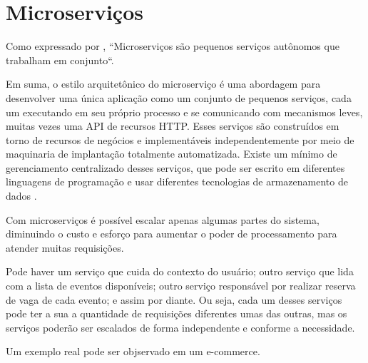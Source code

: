 \chapter{Microserviços}\label{microservicos}

Como expressado por
\cite{building-microservices}, ``Microserviços são pequenos serviços
autônomos que trabalham em conjunto``.

\begin{citacao}
Em suma, o estilo arquitetônico do microserviço é uma abordagem para desenvolver
uma única aplicação como um conjunto de pequenos serviços, cada um executando em seu próprio processo e se comunicando
com mecanismos leves, muitas vezes uma API de recursos HTTP. Esses serviços são construídos em torno de recursos de
negócios e implementáveis independentemente por meio de maquinaria de implantação totalmente automatizada.
Existe um mínimo de gerenciamento centralizado desses serviços, que pode ser escrito em diferentes linguagens de
programação e usar diferentes tecnologias de armazenamento de dados \cite{martin-fowler-microservices}.
\end{citacao}

Com microserviços é possível escalar apenas algumas partes do sistema, diminuindo
o custo e esforço para aumentar o poder de processamento para atender muitas requisições.

Pode haver um serviço que cuida do contexto do usuário; outro serviço que lida com a
lista de eventos disponíveis; outro serviço responsável por realizar reserva de vaga de
cada evento; e assim por diante. Ou seja, cada um desses serviços pode ter a sua a quantidade
de requisições diferentes umas das outras, mas os serviços poderão ser escalados de forma
independente e conforme a necessidade.

Um exemplo real pode ser objservado em um e-commerce.

